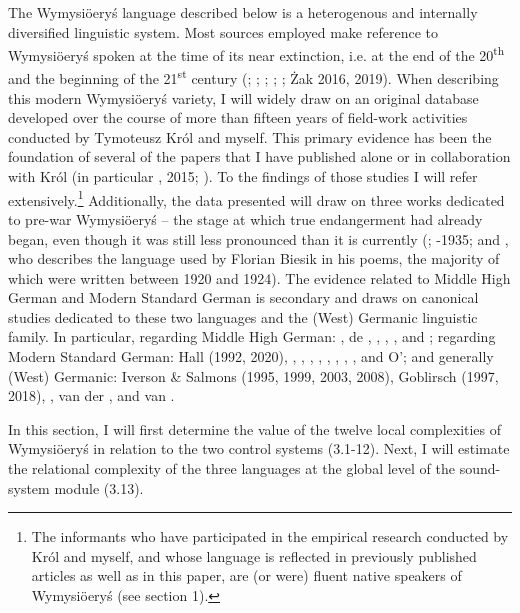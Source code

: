 \documentclass[output=paper]{langscibook}
\begin{document}
The Wymysiöeryś language described below is a heterogenous and internally diversified linguistic system. Most sources employed make reference to Wymysiöeryś spoken at the time of its near extinction, i.e. at the end of the 20\textsuperscript{th} and the beginning of the 21\textsuperscript{st} century (\citealt{Lasatowicz1992}; \citealt{Wicherkiewicz1998,20031998}; \citealt{ZieniukowaWicherkiewicz2001}; \citealt{Ritchie2012}; \citealt{Weckwerth2015}; Żak 2016, 2019). When describing this modern Wymysiöeryś variety, I will widely draw on an original database developed over the course of more than fifteen years of field-work activities conducted by Tymoteusz Król and myself. This primary evidence has been the foundation of several of the papers that I have published alone or in collaboration with Król (in particular \citealt{Andrason2014a,2014b2014a}, 2015; \citealt{AndrasonKról2016}). To the findings of those studies I will refer extensively.\footnote{The informants who have participated in the empirical research conducted by Król and myself, and whose language is reflected in previously published articles as well as in this paper, are (or were) fluent native speakers of Wymysiöeryś (see section 1).} Additionally, the data presented will draw on three works dedicated to pre-war Wymysiöeryś – the stage at which true endangerment had already began, even though it was still less pronounced than it is currently (\citealt{Kleczkowski1920,19211920}; \citealt{Mojmir1930}-1935; and \citealt{Wicherkiewicz2003}, who describes the language used by Florian Biesik in his poems, the majority of which were written between 1920 and 1924). The evidence related to Middle High German and Modern Standard German is secondary and draws on canonical studies dedicated to these two languages and the (West) Germanic linguistic family. In particular, regarding Middle High German: \citet{Wright1917}, de \citet{BoorWisniewski1973}, \citet{Simmler1985}, \citet{Paul2007}, \citet{Hennings2012}, and \citet{Hall2017}; regarding Modern Standard German: Hall (1992, 2020), \citet{Russ1994}, \citet{Eisenberg1994}, \citet{Wiese1996}, \citet{DoddEtAl2003}, \citet{Fox2005}, \citet{JohnsonBraber2008}, \citet{Fagan2009}, \citet{Caratini2009}, and O’\citealt{BrienFagan2016}; and generally (West) Germanic: Iverson \& Salmons (1995, 1999, 2003, 2008), Goblirsch (1997, 2018), \citet{Harbert2007}, van der \citet{Hoek2010}, and van \citet{Oostendorp2020}.

In this section, I will first determine the value of the twelve local complexities of Wymysiöeryś in relation to the two control systems (3.1-12). Next, I will estimate the relational complexity of the three languages at the global level of the sound-system module (3.13).
\end{document}
